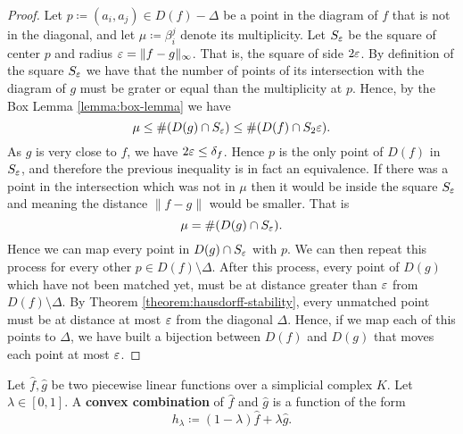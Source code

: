 \begin{proof}
    Let $ p \coloneq (a_i, a_j) \in D(f) - \Delta $ be a point in the diagram of $ f $ that is not in the diagonal, and let $ \mu \coloneq \beta_i^j $ denote its multiplicity. Let $S_\varepsilon$ be the square of center $ p $ and radius $\varepsilon = \| f- g \|_\infty $. That is, the square of side $ 2 \varepsilon $. By definition of the square $ S_\varepsilon $ we have that the number of points of its intersection with the diagram of $ g $ must be grater or equal than the multiplicity at $ p $. Hence, by the Box Lemma \ref{lemma:box-lemma} we have
    \begin{equation}
        \mu \leq \# (D(g) \cap S_\varepsilon) \leq \#(D(f) \cap S_2\varepsilon).
    \end{equation}
    As $ g $ is very close to $ f $, we have $ 2\varepsilon \leq \delta_f $. Hence $ p $ is the only point of $ D(f) $ in $ S_\varepsilon$, and therefore the previous inequality is in fact an equivalence. If there was a point in the intersection which was not in $\mu $ then it would be inside the square $ S_\varepsilon $ and meaning the distance $\| f - g \| $ would be smaller. That is
    \begin{equation}
        \mu = \# (D(g) \cap S_\varepsilon).
    \end{equation}
    Hence we can map every point in $ D(g) \cap S_\varepsilon $ with $ p $. We can then repeat this process for every other $ p \in D(f) \setminus \Delta $. After this process, every point of $ D(g) $ which have not been matched yet, must be at distance greater than $ \varepsilon $ from $ D(f) \setminus \Delta $. By Theorem \ref{theorem:hausdorff-stability}, every unmatched point must be at distance at most $ \varepsilon $ from the diagonal $ \Delta $. Hence, if we map each of this points to $ \Delta $, we have built a bijection between $ D(f) $ and $ D(g) $ that moves each point at most $ \varepsilon $.
\end{proof}

\begin{definition}
    Let $\hat f, \hat g $ be two piecewise linear functions over a simplicial complex $ K $. Let $ \lambda \in [0, 1] $. A {\bf convex combination} of $ \hat f $ and $ \hat g $ is a function of the form
    \begin{equation}
        h_\lambda \coloneq (1-\lambda) \hat f + \lambda \hat g.
    \end{equation}
\end{definition}


